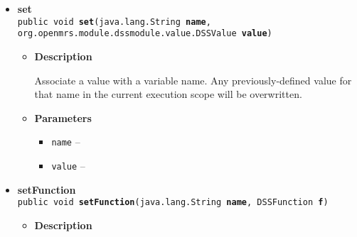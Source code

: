 {{{{\begin{itemize}
{\begin{itemize}
{Get a list of all variable names defined in this execution context
}
\item{{\bf  Returns} -- 
 
}%
\end{itemize}
}%
\item{ 
\hypertarget{org.openmrs.module.dssmodule.state.ExecutionContext.set(java.lang.String, org.openmrs.module.dssmodule.value.DSSValue)}{{\bf  set}\\}
\texttt{public void\ {\bf  set}(\texttt{java.lang.String} {\bf  name},
\texttt{org.openmrs.module.dssmodule.value.DSSValue} {\bf  value})
\label{org.openmrs.module.dssmodule.state.ExecutionContext.set(java.lang.String, org.openmrs.module.dssmodule.value.DSSValue)}}%
\begin{itemize}
\item{
{\bf  Description}

Associate a value with a variable name. Any previously-defined value for that name in the current execution scope will be overwritten.
}
\item{
{\bf  Parameters}
  \begin{itemize}
   \item{
\texttt{name} -- }
   \item{
\texttt{value} -- }
  \end{itemize}
}%
\end{itemize}
}%
\item{ 
\hypertarget{org.openmrs.module.dssmodule.state.ExecutionContext.setFunction(java.lang.String, org.openmrs.module.dssmodule.state.DSSFunction)}{{\bf  setFunction}\\}
\texttt{public void\ {\bf  setFunction}(\texttt{java.lang.String} {\bf  name},
\texttt{DSSFunction} {\bf  f})
\label{org.openmrs.module.dssmodule.state.ExecutionContext.setFunction(java.lang.String, org.openmrs.module.dssmodule.state.DSSFunction)}}%
\begin{itemize}
\item{
{\bf  Description}

}
\end{itemize}}
\end{itemize}}}}}
